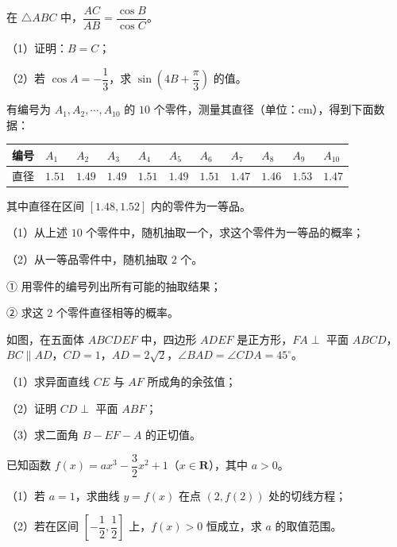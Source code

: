 \begin{question}
在 $\triangle ABC$ 中，$\dfrac{AC}{AB}=\dfrac{\cos B}{\cos C}$。

（1）证明：$B=C$；

（2）若 $\cos A=-\dfrac13$，求 $\sin\left(4B+\dfrac\pi3\right)$ 的值。

\end{question}
\begin{question}
有编号为 $A_1,A_2,\cdots,A_{10}$ 的 $10$ 个零件，测量其直径（单位：$\mathrm{cm}$），得到下面数据：

\begin{center}
\begingroup\setlength{\tabcolsep}{4pt}
\begin{tabular}{lllllllllll}
\toprule
编号 & $A_1$ & $A_2$ & $A_3$ & $A_4$ & $A_5$ & $A_6$ & $A_7$ & $A_8$ & $A_9$ & $A_{10}$ \\
\midrule
直径 & $1.51$ & $1.49$ & $1.49$ & $1.51$ & $1.49$ & $1.51$ & $1.47$ & $1.46$ & $1.53$ & $1.47$ \\
\bottomrule
\end{tabular}
\endgroup
\end{center}

其中直径在区间 $[1.48,1.52]$ 内的零件为一等品。

（1）从上述 $10$ 个零件中，随机抽取一个，求这个零件为一等品的概率；

（2）从一等品零件中，随机抽取 $2$ 个。

① 用零件的编号列出所有可能的抽取结果；

② 求这 $2$ 个零件直径相等的概率。

\Needspace{0.4\textheight}
\end{question}
\begingroup
\renewenvironment{question}{\Needspace{0.5\textheight}}{}
\begin{question}
如图，在五面体 $ABCDEF$ 中，四边形 $ADEF$ 是正方形，$FA\perp$ 平面 $ABCD$，$BC\parallel AD$，$CD=1$，$AD=2\sqrt2$，$\angle BAD=\angle CDA=45^\circ$。

（1）求异面直线 $CE$ 与 $AF$ 所成角的余弦值；

（2）证明 $CD\perp$ 平面 $ABF$；

（3）求二面角 $B-EF-A$ 的正切值。
\nopagebreak[4]
\begin{center}\end{center}
\nopagebreak[4]
\end{question}
\endgroup
\begin{question}
已知函数 $f(x)=ax^3-\dfrac32x^2+1$（$x\in\mathbf R$），其中 $a>0$。

（1）若 $a=1$，求曲线 $y=f(x)$ 在点 $(2,f(2))$ 处的切线方程；

（2）若在区间 $\left[-\dfrac12,\dfrac12\right]$ 上，$f(x)>0$ 恒成立，求 $a$ 的取值范围。

\end{question}
